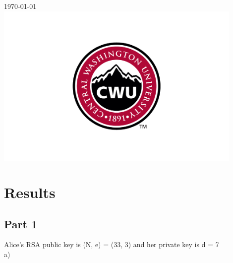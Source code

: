 \documentclass[12pt]{article}
\begin{document}
\begin{titlepage}
		
		
		{\large \today}\\ %
		
		
		\includegraphics[width=12cm]{CWU-Logo.png}\\[.5cm] %
		
		
		\vfill %
		
	\end{titlepage}
	\newpage
	\tableofcontents
	\newpage
	
	
	
	\section{Results}
		\subsection{Part 1}
			Alice's RSA public key  is (N, e) = (33, 3) and her private key is d = 7\\
			a)\\
			
\end{document}
